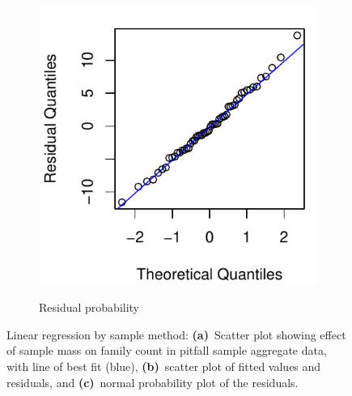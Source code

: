\documentclass[10pt,letterpaper,twocolumn]{article}
\begin{document}
\begin{figure}[h]
\begin{subfigure}[b]{0.15\textwidth}
		\label{fig:bulk_pitfall_resid}
	\end{subfigure}
	~
	\begin{subfigure}[b]{0.15\textwidth}
		\caption{Residual probability}
		\includegraphics[width=\textwidth]{plots//bulk/2015_bulk_pitfall_qqplot.pdf}
		\label{fig:bulk_pitfall_qqplot}
	\end{subfigure}
	\caption{Linear regression by sample method: \textbf{(a)}~Scatter plot showing effect of sample mass on family count in pitfall sample aggregate data, with line of best fit (blue), \textbf{(b)}~scatter plot of fitted values and residuals, and \textbf{(c)}~normal probability plot of the residuals.}
	\label{fig:bulk_pitfall_mass_vs_family}
	\smallskip
	\nointerlineskip
	\hrulefill
\end{figure}
\end{document}
